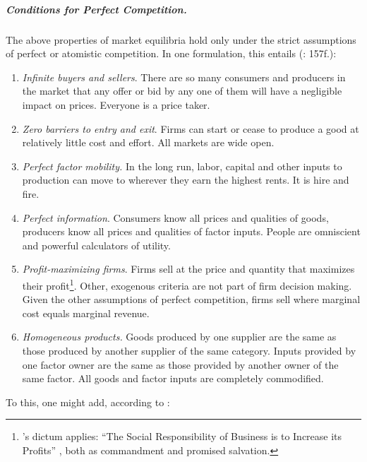 \subparagraph[Perfect Competition]{Conditions for Perfect Competition.} \label{sec:perfect_competition} The above properties of market equilibria hold only under the strict assumptions of perfect or atomistic competition. In one formulation, this entails (\citealt{McDowell2006}: 157f.): 
\begin{enumerate}
	\item \emph{Infinite buyers and sellers}.\label{it:infinite_buyers_sellers} There are so many consumers and producers in the market that any offer or bid by any one of them will have a negligible impact on prices. Everyone is a price taker.
	\item \emph{Zero barriers to entry and exit}. \label{it:easy_entry_exit} 
		Firms can start or cease to produce a good at relatively little cost and effort. All markets are wide open. 
	\item \emph{Perfect factor mobility.} \label{it:perfect_factor_mobility} 
		In the long run, labor, capital and other inputs to production can move to wherever they earn the highest rents. It is hire and fire.
	\item \emph{Perfect information}. \label{it:perfect_information} 
		Consumers know all prices and qualities of goods, producers know all prices and qualities of factor inputs. People are omniscient and powerful calculators of utility.
	\item \emph{Profit-maximizing firms}. \label{it:profit-maximizing_firms} 
		Firms sell at the price and quantity that maximizes their profit\footnote{
			\citeauthor{Friedman1970a}'s dictum applies: ``The Social Responsibility of Business is to Increase its Profits'' \citeyearpar{Friedman1970a}, both as commandment and promised salvation.}.
		Other, exogenous criteria are not part of firm decision making. Given the other assumptions of perfect competition, firms sell where marginal cost equals marginal revenue.
	\item \emph{Homogeneous products.}\label{it:homogeneous_products}
		Goods produced by one supplier are the same as those produced by another supplier of the same category. Inputs provided by one factor owner are the same as those provided by another owner of the same factor. All goods and factor inputs are completely commodified. 
\end{enumerate} 
To this, one might add, according to \citeauthor{Wikipedia2012}:
